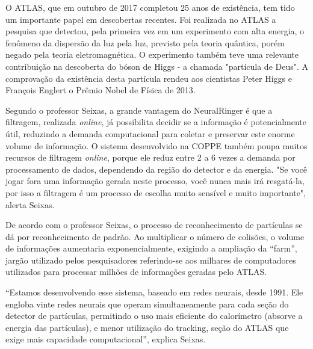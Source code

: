 \begin{itemize}
    O ATLAS, que em outubro de 2017 completou 25 anos de existência, tem tido um 
    importante papel em descobertas recentes. Foi realizada no ATLAS a pesquisa 
    que  detectou, pela primeira vez em um experimento com alta energia, o fenômeno 
    da dispersão da luz pela luz, previsto pela teoria quântica, porém negado pela 
    teoria eletromagnética. O experimento também teve uma relevante contribuição 
    na descoberta do bóson de Higgs - a chamada "partícula de Deus". A comprovação 
    da existência desta partícula rendeu aos cientistas Peter Higgs e François 
    Englert o Prêmio Nobel de Física de 2013.

    Segundo o professor Seixas, a grande vantagem do NeuralRinger é que a filtragem, 
    realizada \emph{online}, já possibilita decidir se a informação é potencialmente útil, 
    reduzindo a demanda computacional para coletar e preservar este enorme volume de 
    informação. O sistema desenvolvido na COPPE também poupa muitos recursos de filtragem 
    \emph{online}, porque ele reduz entre 2 a 6 vezes a demanda por processamento de dados, 
    dependendo da região do detector e da energia. "Se você jogar fora uma informação 
    gerada neste processo, você nunca mais irá resgatá-la, por isso a filtragem é 
    um processo de escolha muito sensível e muito importante", alerta Seixas.
 
    De acordo com o professor Seixas, o processo de reconhecimento de partículas 
    se dá por reconhecimento de padrão. Ao multiplicar o número de colisões, o volume 
    de informações aumentaria exponencialmente, exigindo a ampliação da ``farm'', 
    jargão utilizado pelos pesquisadores referindo-se aos milhares de computadores 
    utilizados para processar milhões de informações geradas pelo ATLAS.
     
    ``Estamos desenvolvendo esse sistema, baseado em redes neurais, desde 1991. 
    Ele engloba vinte redes neurais que operam simultaneamente para cada seção 
    do detector de partículas, permitindo o uso mais eficiente do 
    calorímetro (absorve a energia das partículas), e menor utilização do tracking, 
    seção do ATLAS que exige mais capacidade computacional'', explica Seixas.

\end{itemize}
